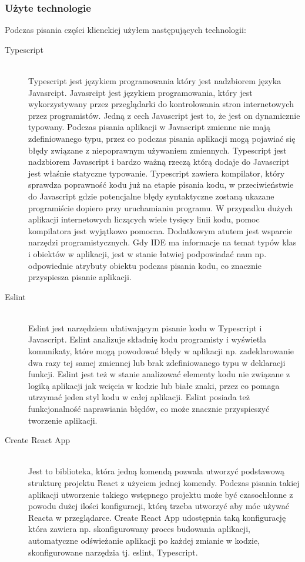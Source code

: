 \subsubsection{Użyte technologie}
Podczas pisania części klienckiej użyłem następujących technologii:
\begin{description}
  \item[Typescript] \hfill \\ Typescript jest językiem programowania który jest nadzbiorem języka Javasrcipt. Javasrcipt jest językiem programowania, który jest wykorzystywany przez przeglądarki do kontrolowania stron internetowych przez programistów. Jedną z cech Javascript jest to, że jest on dynamicznie typowany. Podczas pisania aplikacji w Javascript zmienne nie mają zdefiniowanego typu, przez co podczas pisania aplikacji mogą pojawiać się błędy związane z niepoprawnym używaniem zmiennych. Typescript jest nadzbiorem Javascript i bardzo ważną rzeczą którą dodaje do Javascript jest właśnie statyczne typowanie. Typescript zawiera kompilator, który sprawdza poprawność kodu już na etapie pisania kodu, w przeciwieństwie do Javascript gdzie potencjalne błędy syntaktyczne zostaną ukazane programiście dopiero przy uruchamianiu programu. W przypadku dużych aplikacji internetowych liczących wiele tysięcy linii kodu, pomoc kompilatora jest wyjątkowo pomocna. Dodatkowym atutem jest wsparcie narzędzi programistycznych. Gdy IDE ma informacje na temat typów klas i obiektów w aplikacji, jest w stanie łatwiej podpowiadać nam np. odpowiednie atrybuty obiektu podczas pisania kodu, co znacznie przyspiesza pisanie aplikacji.
  \item[Eslint] \hfill \\ Eslint jest narzędziem ułatiwającym pisanie kodu w Typescript i Javascript. Eslint analizuje składnię kodu programisty i wyświetla komunikaty, które mogą powodować błędy w aplikacji np. zadeklarowanie dwa razy tej samej zmiennej lub brak zdefiniowanego typu w deklaracji funkcji. Eslint jest też w stanie analizować elementy kodu nie związane z logiką aplikacji jak wcięcia w kodzie lub białe znaki, przez co pomaga utrzymać jeden styl kodu w całej aplikacji. Eslint posiada też funkcjonalność naprawiania błędów, co może znacznie przyspieszyć tworzenie aplikacji.
  \item[Create React App] \hfill \\ Jest to biblioteka, która jedną komendą pozwala utworzyć podstawową strukturę projektu React z użyciem jednej komendy. Podczas pisania takiej aplikacji utworzenie takiego wstępnego projektu może być czasochłonne z powodu dużej ilości konfiguracji, którą trzeba utworzyć aby móc używać Reacta w przeglądarce. Create React App udostępnia taką konfigurację która zawiera np. skonfigurowany proces budowania aplikacji, automatyczne odświeżanie aplikacji po każdej zmianie w kodzie, skonfigurowane narzędzia tj. eslint, Typescript.

\end{description}
